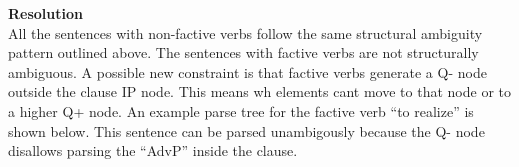\documentclass{article}
\begin{document}
\newpage
\large\textbf{Resolution}\\
\hfill\break
All the sentences with non-factive verbs follow the same structural ambiguity
pattern outlined above. The sentences with factive verbs are not structurally
ambiguous. A possible new constraint is that factive verbs generate a Q- node
outside the clause IP node. This means wh elements cant move to that node or
to a higher Q+ node. An example parse tree for the factive verb ``to realize''
is shown below. This sentence can be parsed unambigously because the Q- node
disallows parsing the ``AdvP'' inside the clause. \\
\hfill\break

\end{document}
